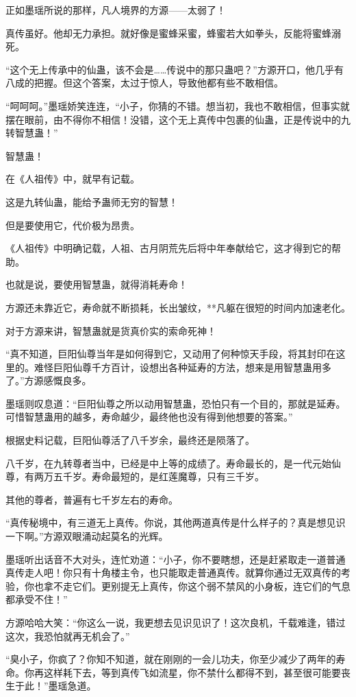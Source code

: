 \begin{this_body}
正如墨瑶所说的那样，凡人境界的方源——太弱了！

真传虽好。他却无力承担。就好像是蜜蜂采蜜，蜂蜜若大如拳头，反能将蜜蜂溺死。

“这个无上传承中的仙蛊，该不会是……传说中的那只蛊吧？”方源开口，他几乎有八成的把握。但这个答案，太过于惊人，导致他都有些不敢相信。

“呵呵呵。”墨瑶娇笑连连，“小子，你猜的不错。想当初，我也不敢相信，但事实就摆在眼前，由不得你不相信！没错，这个无上真传中包裹的仙蛊，正是传说中的九转智慧蛊！”

智慧蛊！

在《人祖传》中，就早有记载。

这是九转仙蛊，能给予蛊师无穷的智慧！

但是要使用它，代价极为昂贵。

《人祖传》中明确记载，人祖、古月阴荒先后将中年奉献给它，这才得到它的帮助。

也就是说，要使用智慧蛊，就得消耗寿命！

方源还未靠近它，寿命就不断损耗，长出皱纹，**凡躯在很短的时间内加速老化。

对于方源来讲，智慧蛊就是货真价实的索命死神！

“真不知道，巨阳仙尊当年是如何得到它，又动用了何种惊天手段，将其封印在这里的。难怪巨阳仙尊千方百计，设想出各种延寿的方法，想来是用智慧蛊用多了。”方源感慨良多。

墨瑶则叹息道：“巨阳仙尊之所以动用智慧蛊，恐怕只有一个目的，那就是延寿。可惜智慧蛊用的越多，寿命越少，最终他也没有得到他想要的答案。”

根据史料记载，巨阳仙尊活了八千岁余，最终还是陨落了。

八千岁，在九转尊者当中，已经是中上等的成绩了。寿命最长的，是一代元始仙尊，有两万五千岁。寿命最短的，是红莲魔尊，只有三千岁。

其他的尊者，普遍有七千岁左右的寿命。

“真传秘境中，有三道无上真传。你说，其他两道真传是什么样子的？真是想见识一下啊。”方源双眼涌动起莫名的光辉。

墨瑶听出话音不大对头，连忙劝道：“小子，你不要瞎想，还是赶紧取走一道普通真传走人吧！你只有十角楼主令，也只能取走普通真传。就算你通过无双真传的考验，你也拿不走它们。更别提无上真传，你这个弱不禁风的小身板，连它们的气息都承受不住！”

方源哈哈大笑：“你这么一说，我更想去见识见识了！这次良机，千载难逢，错过这次，我恐怕就再无机会了。”

“臭小子，你疯了？你知不知道，就在刚刚的一会儿功夫，你至少减少了两年的寿命。你再这样耗下去，等到真传飞如流星，你不禁什么都得不到，甚至很可能要丧生于此！”墨瑶急道。


\end{this_body}
